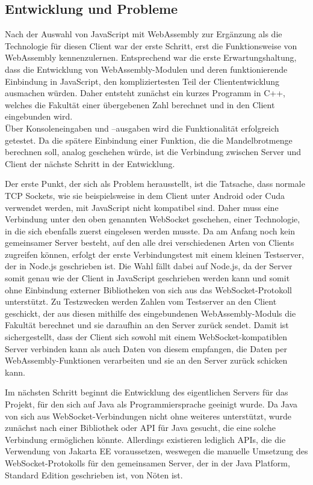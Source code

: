 \documentclass[12pt, onecolumn,notitlepage]{scrartcl}
\begin{document}
\subsection{Entwicklung und Probleme}
Nach der Auswahl von JavaScript mit WebAssembly zur Ergänzung als die Technologie für diesen Client war der erste Schritt, erst die Funktionsweise von WebAssembly kennenzulernen. Entsprechend war die erste Erwartungshaltung, dass die Entwicklung von WebAssembly-Modulen und deren funktionierende Einbindung in JavaScript, den kompliziertesten Teil der Cliententwicklung ausmachen würden. Daher entsteht zunächst ein kurzes Programm in C++, welches die Fakultät einer übergebenen Zahl berechnet und in den Client eingebunden wird. \\
Über Konsoleneingaben und –ausgaben wird die Funktionalität erfolgreich getestet. Da die spätere Einbindung einer Funktion, die die Mandelbrotmenge berechnen soll, analog geschehen würde, ist die Verbindung zwischen Server und Client der nächste Schritt in der Entwicklung. \par

Der erste Punkt, der sich als Problem herausstellt, ist die Tatsache, dass normale TCP Sockets, wie sie beispielsweise in dem Client unter Android oder Cuda verwendet werden, mit JavaScript nicht kompatibel sind. Daher muss eine Verbindung unter den oben genannten WebSocket geschehen, einer Technologie, in die sich ebenfalls zuerst eingelesen werden musste. Da am Anfang noch kein gemeinsamer Server besteht, auf den alle drei verschiedenen Arten von Clients zugreifen können, erfolgt der erste Verbindungstest mit einem kleinen Testserver, der in Node.js geschrieben ist. Die Wahl fällt dabei auf Node.js, da der Server somit genau wie der Client in JavaScript geschrieben werden kann und somit ohne Einbindung externer Bibliotheken von sich aus das WebSocket-Protokoll unterstützt. Zu Testzwecken werden Zahlen vom Testserver an den Client geschickt, der aus diesen mithilfe des eingebundenen WebAssembly-Moduls die Fakultät berechnet und sie daraufhin an den Server zurück sendet. Damit ist sichergestellt, dass der Client sich sowohl mit einem WebSocket-kompatiblen Server verbinden kann als auch Daten von diesem empfangen, die Daten per WebAssembly-Funktionen verarbeiten und sie an den Server zurück schicken kann. \par

Im nächsten Schritt beginnt die Entwicklung des eigentlichen Servers für das Projekt, für den sich auf Java als Programmiersprache geeinigt wurde. Da Java von sich aus WebSocket-Verbindungen nicht ohne weiteres unterstützt, wurde zunächst nach einer Bibliothek oder API für Java gesucht, die eine solche Verbindung ermöglichen könnte. Allerdings existieren lediglich APIs, die die Verwendung von Jakarta EE voraussetzen, weswegen die manuelle Umsetzung des WebSocket-Protokolls für den gemeinsamen Server, der in der Java Platform, Standard Edition geschrieben ist, von Nöten ist. \par
\end{document}
